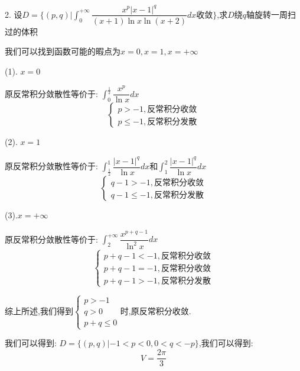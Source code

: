 2. 设$D=\{(p,q)|\int_{0}^{+\infty}\dfrac{x^p|x-1|^q}{(x+1)\ln x\ln(x+2)}dx\text{收敛}\}$,求$D$绕$q$轴旋转一周扫过的体积
\begin{solution}

	我们可以找到函数可能的暇点为$x=0,x=1,x=+\infty$
	
	(1). $x=0$
	
	原反常积分敛散性等价于:  $\int_{0}^{\frac{1}{2}}\dfrac{x^p}{\ln x}dx$
	$$\left\lbrace
	\begin{array}{l}
		p>-1,\text{反常积分收敛}\\
		p\leq-1,\text{反常积分发散}
	\end{array}
	\right. $$
	
	(2). $x=1$
	
	原反常积分敛散性等价于:  $\int_{\frac{1}{2}}^{1}\dfrac{|x-1|^q}{\ln x}dx$和$\int_{1}^{2}\dfrac{|x-1|^q}{\ln x}dx$
	$$\left\lbrace
	\begin{array}{l}
		q-1>-1,\text{反常积分收敛}\\
		q-1\leq-1,\text{反常积分发散}
	\end{array}
	\right. $$
	
	(3).$x=+\infty$
	
	原反常积分敛散性等价于:  $\int_{2}^{+\infty}\dfrac{x^{p+q-1}}{\ln^2 x}dx$
	$$\left\lbrace
	\begin{array}{l}
		p+q-1<-1,\text{反常积分收敛}\\
		p+q-1=-1,\text{反常积分收敛}\\
		p+q-1>-1,\text{反常积分发散}
	\end{array}
	\right. $$
	
	综上所述,我们得到$\left\lbrace
	\begin{array}{l}
		p>-1\\
		q>0\\
		p+q\leq 0
	\end{array}
	\right. $时,原反常积分收敛.
	
	我们可以得到:  $D=\{(p,q)|-1<p<0,0<q<-p\}$,我们可以得到:  
	$$V=\dfrac{2\pi}{3}$$
\end{solution}

